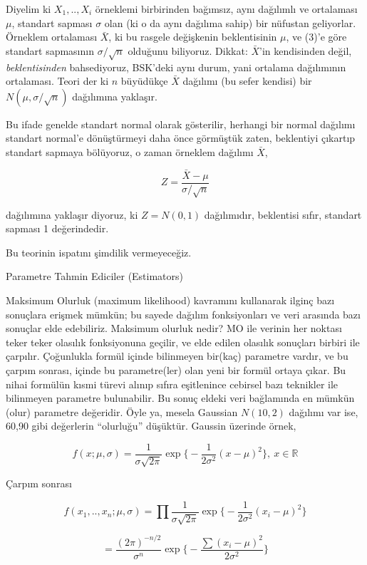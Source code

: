 \documentclass[12pt,fleqn]{article}\usepackage{../../common}
\begin{document}
Diyelim ki $X_1,..,X_i$ örneklemi birbirinden bağımsız, aynı dağılımlı ve
ortalaması $\mu$, standart sapması $\sigma$ olan (ki o da aynı dağılıma
sahip) bir nüfustan geliyorlar. Örneklem ortalaması $\bar{X}$, ki bu
rasgele değişkenin beklentisinin $\mu$, ve (3)'e göre standart sapmasının
$\sigma / \sqrt{n}$ olduğunu biliyoruz. Dikkat: $\bar{X}$'in kendisinden
değil, {\em beklentisinden} bahsediyoruz, BSK'deki aynı durum, yani
ortalama dağılımının ortalaması. Teori der ki $n$ büyüdükçe $\bar{X}$
dağılımı (bu sefer kendisi) bir $N(\mu, \sigma/\sqrt{n})$ dağılımına
yaklaşır.

Bu ifade genelde standart normal olarak gösterilir, herhangi bir normal
dağılımı standart normal'e dönüştürmeyi daha önce görmüştük zaten,
beklentiyi çıkartıp standart sapmaya bölüyoruz, o zaman örneklem dağılımı
$\bar{X}$,

$$ Z = \frac{\bar{X} - \mu}{\sigma / \sqrt{n}} $$

dağılımına yaklaşır diyoruz, ki $Z = N(0,1)$ dağılımıdır, beklentisi sıfır,
standart sapması 1 değerindedir. 

Bu teorinin ispatını şimdilik vermeyeceğiz. 

Parametre Tahmin Ediciler (Estimators) 

Maksimum Olurluk (maximum likelihood) kavramını kullanarak ilginç bazı
sonuçlara erişmek mümkün; bu sayede dağılım fonksiyonları ve veri arasında
bazı sonuçlar elde edebiliriz. Maksimum olurluk nedir? MO ile verinin her
noktası teker teker olasılık fonksiyonuna geçilir, ve elde edilen olasılık
sonuçları birbiri ile çarpılır. Çoğunlukla formül içinde bilinmeyen
bir(kaç) parametre vardır, ve bu çarpım sonrası, içinde bu parametre(ler)
olan yeni bir formül ortaya çıkar. Bu nihai formülün kısmi türevi alınıp
sıfıra eşitlenince cebirsel bazı teknikler ile bilinmeyen parametre
bulunabilir. Bu sonuç eldeki veri bağlamında en mümkün (olur) parametre
değeridir. Öyle ya, mesela Gaussian $N(10,2)$ dağılımı var ise, 60,90 gibi
değerlerin ``olurluğu'' düşüktür. Gaussin üzerinde örnek,

$$
f(x;\mu,\sigma) = \frac{1}{\sigma\sqrt{2\pi}} 
\exp \bigg\{ - \frac{1}{2\sigma^2}(x-\mu)^2  \bigg\}
, \ x \in \mathbb{R}
$$
 
Çarpım sonrası

$$ f(x_1,..,x_n;\mu,\sigma) = 
\prod \frac{1}{\sigma\sqrt{2\pi}} 
\exp \bigg\{ - \frac{1}{2\sigma^2}(x_i-\mu)^2  \bigg\}
$$

$$ =
\frac{(2\pi)^{-n/2}}{\sigma^n}
\exp \bigg\{ - \frac{\sum (x_i-\mu)^2}{2\sigma^2}  \bigg\}
$$
\end{document}
